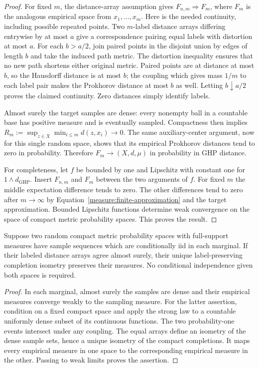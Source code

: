 \begin{proof}
For fixed $m$, the distance-array assumption gives $F_{n,m}\Rightarrow F_m$,
where $F_m$ is the analogous empirical space from $x_1,\ldots,x_m$.
Here is the needed continuity, including possible repeated points.
Two $m$-label distance arrays differing entrywise by at most $a$ give
a correspondence pairing equal labels with distortion at most $a$.
For each $b>a/2$, join paired points in the disjoint union by edges of
length $b$ and take the induced path metric. The distortion inequality
ensures that no new path shortens either original metric. Paired
points are at distance at most $b$, so the Hausdorff distance is at most
$b$; the coupling which gives mass $1/m$ to each label pair makes the
Prokhorov distance at most $b$ as well. Letting $b\downarrow a/2$
proves the claimed continuity. Zero distances simply identify labels.

Almost surely the target samples are dense: every nonempty ball in a
countable base has positive measure and is eventually sampled.
Compactness then implies $R_m:=\sup_{z\in X}\min_{i\leq m}d(z,x_i)\to0$.
The same auxiliary-center argument, now for this single random space,
shows that its empirical Prokhorov distances tend to zero in probability.
Therefore $F_m\to(X,d,\mu)$ in probability in GHP distance.

For completeness, let $f$ be bounded by one and Lipschitz with constant
one for $1\wedge d_{\mathrm{GHP}}$. Insert $F_{n,m}$ and $F_m$ between
the two arguments of $f$. For fixed $m$ the middle expectation
difference tends to zero. The other differences tend to zero after
$m\to\infty$ by Equation~\eqref{measure:finite-approximation} and the
target approximation. Bounded Lipschitz functions determine weak
convergence on the space of compact metric probability spaces. This
proves the result.
\end{proof}

\begin{lemma}
\label{measure:common-completion}
Suppose two random compact metric probability spaces with full-support
measures have sample sequences which are conditionally iid in each
marginal. If their labeled distance arrays agree almost surely, their
unique label-preserving completion isometry preserves their measures.
No conditional independence given both spaces is required.
\end{lemma}
\begin{proof}
In each marginal, almost surely the samples are dense and their empirical
measures converge weakly to the sampling measure. For the latter
assertion, condition on a fixed compact space and apply the strong law
to a countable uniformly dense subset of its continuous functions.
The two probability-one events intersect under any coupling.
The equal arrays define an isometry of the dense sample sets, hence a
unique isometry of the compact completions. It maps every empirical
measure in one space to the corresponding empirical measure in the
other. Passing to weak limits proves the assertion.
\end{proof}

